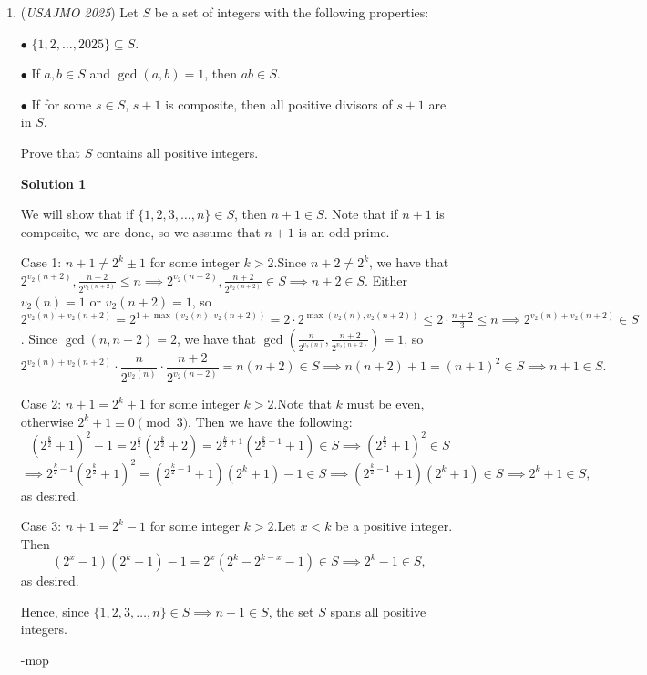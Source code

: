 \begin{enumerate}
 The determinant is obviously $0$, so we have proven the problem (clearly this brainless strategy was a lot more tedious than guessing the circumcenter. However, if one really manages to guess the circumcenter, a synthetic solution would finish it off a lot cleaner than the complex proof).

 


	\item (\textit{USAJMO 2025}) Let $S$ be a set of integers with the following properties:


 $\bullet$ $\{ 1, 2, \dots, 2025 \} \subseteq S$.


 $\bullet$ If $a, b \in S$ and $\gcd(a, b) = 1$, then $ab \in S$.


 $\bullet$ If for some $s \in S$, $s + 1$ is composite, then all positive divisors of $s + 1$ are in $S$.


 Prove that $S$ contains all positive integers.


 



\textbf{Solution 1}

We will show that if $\{1, 2, 3, \dots, n\}\in S$, then $n+1\in S$. Note that if $n+1$ is composite, we are done, so we assume that $n+1$ is an odd prime.

 Case 1: $n+1\ne 2^k\pm 1$ for some integer $k>2$.Since $n+2\ne 2^k$, we have that $2^{v_2 (n+2)}, \frac{n+2}{2^{v_2 (n+2)}}\le n\implies 2^{v_2 (n+2)}, \frac{n+2}{2^{v_2 (n+2)}}\in S\implies n+2\in S$. Either $v_2(n)=1$ or $v_2(n+2)=1$, so $2^{v_2(n)+v_2(n+2)}=2^{1+\max(v_2(n), v_2(n+2))}=2\cdot 2^{\max(v_2(n), v_2(n+2))}\le 2\cdot \frac{n+2}{3}\le n\implies 2^{v_2(n)+v_2(n+2)}\in S$. Since $\gcd(n, n+2)=2$, we have that $\gcd\left(\frac{n}{2^{v_2(n)}}, \frac{n+2}{2^{v_2(n+2)}}\right)=1$, so 
 \[2^{v_2(n)+v_2(n+2)}\cdot \frac{n}{2^{v_2(n)}}\cdot \frac{n+2}{2^{v_2(n+2)}}=n(n+2)\in S\implies n(n+2)+1=(n+1)^2\in S\implies n+1\in S.\]

 Case 2: $n+1=2^k+1$ for some integer $k>2$.Note that $k$ must be even, otherwise $2^k+1\equiv 0\pmod 3$. Then we have the following:
 \[\left(2^{\frac{k}{2}}+1\right)^2-1=2^{\frac{k}{2}}\left(2^{\frac{k}{2}}+2\right)=2^{\frac{k}{2}+1}\left(2^{\frac{k}{2}-1}+1\right)\in S \implies\left(2^{\frac{k}{2}}+1\right)^2\in S\]
 \[\implies 2^{\frac{k}{2}-1}\left(2^{\frac{k}{2}}+1\right)^2 = \left(2^{\frac{k}{2}-1}+1\right)\left(2^k+1\right)-1\in S\implies \left(2^{\frac{k}{2}-1}+1\right)\left(2^k+1\right)\in S\implies 2^k+1\in S,\]as desired.

 Case 3: $n+1=2^k-1$ for some integer $k>2$.Let $x<k$ be a positive integer. Then 
 \[(2^x-1)(2^k-1)-1=2^x\left(2^k-2^{k-x}-1\right)\in S\implies 2^k-1\in S,\] as desired.

 Hence, since $\{1, 2, 3, \dots, n\}\in S\implies n+1\in S$, the set $S$ spans all positive integers.

 -mop

 


\end{enumerate}